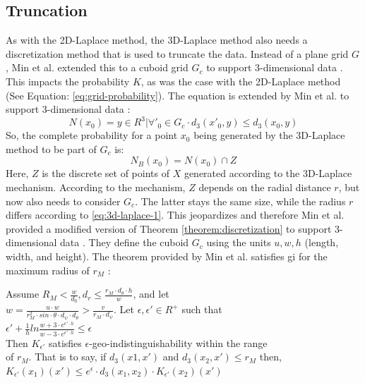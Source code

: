 \newpage
\subsection{Truncation}
As with the 2D-Laplace method, the 3D-Laplace method also needs a discretization method that is used to truncate the data.
Instead of a plane grid $G$, Min et al. extended this to a cuboid grid $G_c$ to support 3-dimensional data \citep{9646489}.
This impacts the probability $K$, as was the case with the 2D-Laplace method (See Equation: \ref{eq:grid-probability}).
The equation is extended by Min et al. to support 3-dimensional data \citep{9646489}:
\begin{equation}
  N(x_0) = { y \in R^3 | \forall'_{0} \in G_c \cdot d_3(x'_{0}, y) \leq d_3(x_0, y)}
  \label{eq:3d-grid-probability}
\end{equation}
So, the complete probability for a point $x_0$ being generated by the 3D-Laplace method to be part of $G_c$ is:
\begin{equation}
  N_B(x_0) = N(x_0) \cap Z
  \label{eq:3d-grid-probability-2}
\end{equation}
Here, $Z$ is the discrete set of points of $X$ generated according to the 3D-Laplace mechanism.
According to the mechanism, $Z$ depends on the radial distance $r$, but now also needs to consider $G_c$.
The latter stays the same size, while the radius $r$ differs according to \ref{eq:3d-laplace-1}.
This jeopardizes  and therefore Min et al. provided a modified version of Theorem \ref{theorem:discretization} to support 3-dimensional data \citep{9646489}.
They define the cuboid $G_c$ using the units $u, w, h$ (length, width, and height).
The theorem provided by Min et al. satisfies \gls{gi} for the maximum radius of $r_M$ \citep{9646489}:
\begin{theorem}
  Assume $R_M < \frac{w}{d_0}, d_r \leq \frac{r_M \cdot d_\theta \cdot h}{w}$, and let \\
  $w = \frac{u \cdot w}{r^2_M \cdot sin \cdot \theta \cdot d_\psi \cdot d_\theta} > \frac{v}{r_M \cdot d_\psi}$. Let $\epsilon, \epsilon' \in R^+$ such that \\
  $\epsilon' + \frac{1}{h} ln \frac{w + 3 \cdot e^{\epsilon' \cdot h}}{w - 3 \cdot e^{\epsilon' \cdot h}} \leq \epsilon$ \\
  Then $K_{\epsilon'}$ satisfies $\epsilon$-geo-indistinguishability within the range \\
  of $r_M$. That is to say, if $d_3(x1, x')$ and $d_3(x_2, x') \leq r_M$ then, \\
  $K_{\epsilon'}(x_1)(x') \leq e^\epsilon \cdot d_3(x_1, x_2) \cdot K_{\epsilon'}(x_2)(x')$
  \label{theorem:3d-discretization}
\end{theorem}
